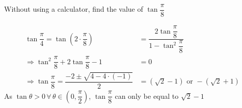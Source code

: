 
%
%
%
%
% 
% 

\question Without using a calculator, find the value of $\tan\dfrac{\pi}{8}$

\insertQR{}

\ifprintanswers
\fi 

\begin{solution}
	\begin{align}
		\tan\dfrac{\pi}{4} = \tan \left(2\cdot\dfrac{\pi}{8}\right) &= \dfrac{2\tan\dfrac{\pi}{8}}{1-\tan^2\dfrac{\pi}{8}} \\
		\Rightarrow \tan^2\dfrac{\pi}{8} + 2\tan\dfrac{\pi}{8} - 1 &= 0 \\
		\Rightarrow\tan\dfrac{\pi}{8} = \dfrac{-2 \pm \sqrt{4 - 4\cdot(-1)}}{2} &= (\sqrt{2}-1)\text{ or }-(\sqrt{2}+1)
	\end{align}
	As $\tan\theta > 0 \,\forall \,\theta \in (0,\dfrac{\pi}{2})$, $\tan\dfrac{\pi}{8}$ can only be equal to
	$\sqrt{2}-1$
\end{solution}
